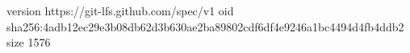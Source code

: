 version https://git-lfs.github.com/spec/v1
oid sha256:4adb12ec29e3b08db62d3b630ae2ba89802cdf6df4e9246a1bc4494d4fb4ddb2
size 1576
